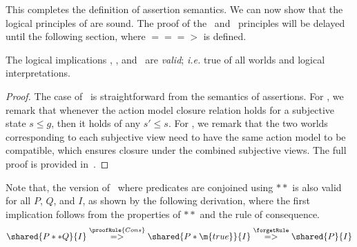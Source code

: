 This completes the definition of assertion semantics. We can now show that the logical principles of \colosl are sound. The proof of the \shiftRule\ and \extendRule\ principles will be delayed until the following section, where $===>$ is defined.

\begin{lemma}\label{lem:semprinciples}
The logical implications \copyRule, \forgetRule, and \mergeRule\ are \emph{valid}; \textit{i.e.} true of all worlds and logical interpretations.
%
%
\begin{proof}
The case of \copyRule\ is straightforward from the semantics of assertions.
For \forgetRule, we remark that whenever the action model closure relation holds for a subjective state $s\leq g$, then it holds of any $s'\leq s$. For \mergeRule, we remark that the two worlds corresponding to each subjective view
need to have the same action model to be compatible, which ensures closure under the combined subjective views. The full proof is provided in~\cite{colosl-tr14}.
\end{proof}
%
%
\end{lemma}
%
%
Note that, the version of \forgetRule\ where predicates are conjoined using $**$ is also valid for all $P$, $Q$, and $I$, as shown by the following derivation, where the first implication follows from the properties of $**$ and the rule of consequence.
%
\[
  \vspace{-1ex}
\shared{P ** Q}{I} \stackrel{\proofRule{Cons }}{=> }
\shared{P * \m{true}}{I} \stackrel{\forgetRule }{=> }
\shared{P}{I}
\]
%
